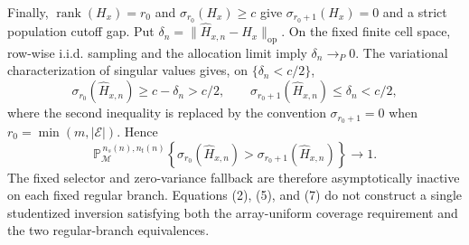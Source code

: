 Finally, \(\operatorname{rank}(H_x)=r_0\) and \(\sigma_{r_0}(H_x)\ge c\) give \(\sigma_{r_0+1}(H_x)=0\) and a strict population cutoff gap. Put \(\delta_n=\lVert\widehat H_{x,n}-H_x\rVert_{\mathrm{op}}\). On the fixed finite cell space, row-wise i.i.d. sampling and the allocation limit imply \(\delta_n\to_P0\). The variational characterization of singular values gives, on \(\{\delta_n<c/2\}\),
\[
\sigma_{r_0}(\widehat H_{x,n})\ge c-\delta_n>c/2,
\qquad
\sigma_{r_0+1}(\widehat H_{x,n})\le\delta_n<c/2,
\tag{6}
\]
where the second inequality is replaced by the convention \(\sigma_{r_0+1}=0\) when \(r_0=\min(m,\lvert\mathcal E\rvert)\). Hence
\[
\mathbb P_{\mathcal M}^{\,n_s(n),n_t(n)}
\left\{\sigma_{r_0}(\widehat H_{x,n})>
\sigma_{r_0+1}(\widehat H_{x,n})\right\}\longrightarrow1.
\tag{7}
\]
The fixed selector and zero-variance fallback are therefore asymptotically inactive on each fixed regular branch. Equations (2), (5), and (7) do not construct a single studentized inversion satisfying both the array-uniform coverage requirement and the two regular-branch equivalences.